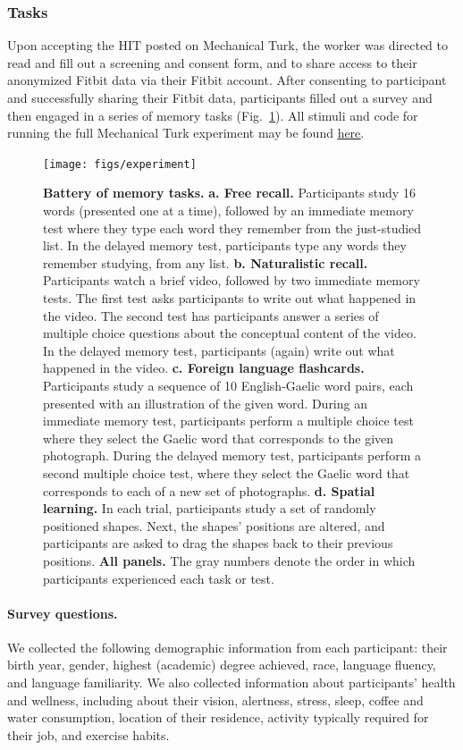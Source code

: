 \documentclass[10pt]{article}
\begin{document}
\subsubsection*{Tasks}
Upon accepting the HIT posted on Mechanical Turk, the worker was
directed to read and fill out a screening and consent form, and to
share access to their anonymized Fitbit data via their Fitbit account.
After consenting to participant and successfully sharing their Fitbit
data, participants filled out a survey and then engaged in a series of
memory tasks (Fig.~\ref{fig:tasks}).  All stimuli and code for running
the full Mechanical Turk experiment may be found
\href{https://github.com/ContextLab/brainfit-task}{\underline{here}}.

\begin{figure}[tp]
\centering
\texttt{[image: figs/experiment]}
\caption{\textbf{Battery of memory tasks.}  \textbf{a.  Free recall.}
Participants study 16 words (presented one at a time), followed by an
immediate memory test where they type
each word they remember from the just-studied list.  In the delayed
memory test, participants type any words they remember studying, from
any list.  \textbf{b. Naturalistic recall.}  Participants watch a
brief video, followed by two immediate memory tests.  The first test
asks participants to write out what happened in the video.  The second
test has participants answer a series of multiple choice questions
about the conceptual content of the video.  In the delayed memory
test, participants (again) write out what happened in the video.
\textbf{c. Foreign language flashcards.}  Participants study a
sequence of 10 English-Gaelic word pairs, each presented with an
illustration of the given word.  During an immediate memory test,
participants perform a multiple choice test where they select the
Gaelic word that corresponds to the given photograph.  During the
delayed memory test, participants perform a second multiple choice
test, where they select the Gaelic word that corresponds to each of a
new set of photographs.  \textbf{d. Spatial learning.}  In each trial,
participants
study a set of randomly positioned shapes.  Next, the shapes'
positions are altered, and participants are asked to drag the shapes
back to their previous positions.  \textbf{All panels.}  The gray
numbers denote the order in which participants experienced each task
or test.}
\label{fig:tasks}
\end{figure}

\paragraph*{Survey questions.}  We collected the following demographic
information from each participant: their birth year, gender, highest
(academic) degree achieved, race, language fluency, and language
familiarity.  We also collected information about participants'
health and wellness, including about their vision, alertness, stress, sleep, coffee
and water consumption, location of their residence, activity typically
required for their job, and exercise habits.
\end{document}
